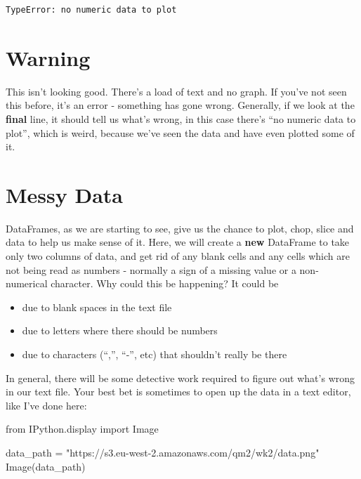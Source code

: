 \documentclass[
  letterpaper,
  DIV=11,
  numbers=noendperiod]{scrreprt}
\newenvironment{Shaded}{\begin{snugshade}}{\end{snugshade}}
\newcommand{\ImportTok}[1]{\textcolor[rgb]{0.00,0.46,0.62}{#1}}
\newcommand{\NormalTok}[1]{\textcolor[rgb]{0.00,0.23,0.31}{#1}}
\newcommand{\OperatorTok}[1]{\textcolor[rgb]{0.37,0.37,0.37}{#1}}
\newcommand{\StringTok}[1]{\textcolor[rgb]{0.13,0.47,0.30}{#1}}
\begin{document}
\begin{verbatim}
TypeError: no numeric data to plot
\end{verbatim}

\hypertarget{warning}{%
\section{Warning}\label{warning}}

This isn't looking good. There's a load of text and no graph. If you've
not seen this before, it's an error - something has gone wrong.
Generally, if we look at the \textbf{final} line, it should tell us
what's wrong, in this case there's ``no numeric data to plot'', which is
weird, because we've seen the data and have even plotted some of it.

\hypertarget{messy-data}{%
\section{Messy Data}\label{messy-data}}

DataFrames, as we are starting to see, give us the chance to plot, chop,
slice and data to help us make sense of it. Here, we will create a
\textbf{new} DataFrame to take only two columns of data, and get rid of
any blank cells and any cells which are not being read as numbers -
normally a sign of a missing value or a non-numerical character. Why
could this be happening? It could be

\begin{itemize}
\item
  due to blank spaces in the text file
\item
  due to letters where there should be numbers
\item
  due to characters (``,'', ``-'', etc) that shouldn't really be there
\end{itemize}

In general, there will be some detective work required to figure out
what's wrong in our text file. Your best bet is sometimes to open up the
data in a text editor, like I've done here:

\begin{Shaded}
\begin{Highlighting}[]
\ImportTok{from}\NormalTok{ IPython.display }\ImportTok{import}\NormalTok{ Image}

\NormalTok{data\_path }\OperatorTok{=} \StringTok{"https://s3.eu{-}west{-}2.amazonaws.com/qm2/wk2/data.png"}
\NormalTok{Image(data\_path)}
\end{Highlighting}
\end{Shaded}
\end{document}

